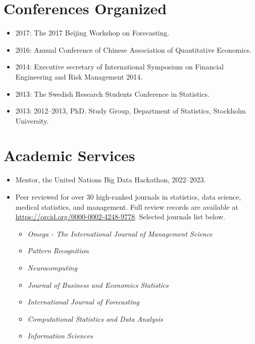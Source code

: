 \documentclass[twoside,a4paper]{article}
\begin{document}
\section{Conferences Organized}

\begin{itemize}
\item 2017: The 2017 Beijing Workshop on Forecasting.
\item 2016: Annual Conference of Chinese Association of Quantitative Economics.
\item 2014: Executive secretary of International Symposium on Financial Engineering and Risk Management 2014.

\item 2013: The Swedish Research Students Conference in Statistics.
\item 2013: 2012–2013, PhD. Study Group, Department of Statistics, Stockholm University.
\end{itemize}

\section{Academic Services}

\begin{itemize}
\item Mentor, the United Nations Big Data Hackathon, 2022--2023.

\item Peer reviewed for over 30 high-ranked journals in statistics, data science, medical statistics, and management. Full review records are available at \url{https://orcid.org/0000-0002-4248-9778}. Selected journals list below.

\begin{itemize}
\item \emph{Omega - The International Journal of Management Science}
\item \emph{Pattern Recognition}
\item \emph{Neurocomputing}
\item  \emph{Journal of Business and Economics Statistics}
\item  \emph{International Journal of Forecasting}
\item  \emph{Computational Statistics and Data Analysis}
\item  \emph{Information Sciences}
\end{itemize}
\end{itemize}
\end{document}
